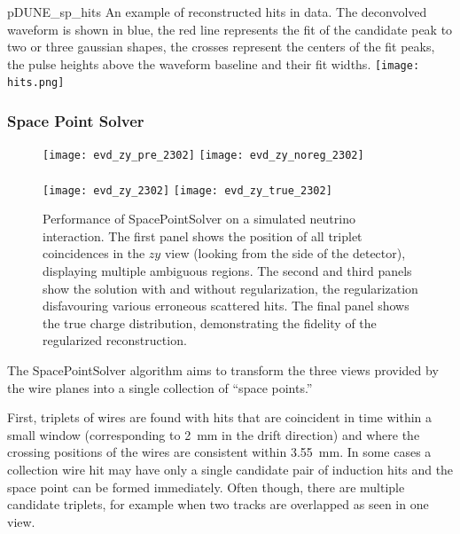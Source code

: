 \begin{dunefigure}
{pDUNE_sp_hits}
{An example of reconstructed hits in  data. The deconvolved waveform is shown in blue, the red line represents the fit of the candidate peak to two or three gaussian shapes, the crosses represent the centers of the fit peaks, the pulse heights above the waveform baseline and their fit widths.}
\texttt{[image: hits.png]}
\end{dunefigure}


\subsubsection{Space Point Solver}

\begin{figure}
\texttt{[image: evd\_zy\_pre\_2302]}
\texttt{[image: evd\_zy\_noreg\_2302]}\\
\\
\texttt{[image: evd\_zy\_2302]}
\texttt{[image: evd\_zy\_true\_2302]}
\\

\caption[Event displays of SpacePointSolver performance]{Performance of SpacePointSolver on a simulated  neutrino interaction. The first panel shows the position of all triplet coincidences in the $zy$ view (looking from the side of the detector), displaying multiple ambiguous regions. The second and third panels show the solution with and without regularization, the regularization disfavouring various erroneous scattered hits. The final panel shows the true charge distribution, demonstrating %
the fidelity of the regularized reconstruction.}

\label{fig:spacepoint}
\end{figure} %

The SpacePointSolver algorithm aims to transform the three \twod views provided by the wire planes into a single collection of \threed ``space points.''

First, triplets of wires are found with hits that are coincident in time within a small window (corresponding to \SI{2}{mm} in the drift direction) and where the crossing positions of the wires are consistent within \SI{3.55}{mm}. In some cases a collection wire hit may have only a single candidate pair of induction hits and the space point can be formed immediately. Often though, there are multiple candidate triplets, for example when two tracks are overlapped as seen in one view.

